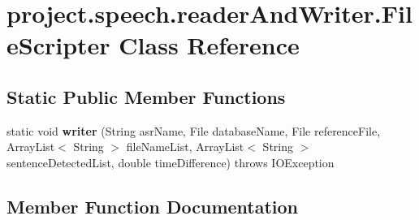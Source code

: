 \section{project.\+speech.\+reader\+And\+Writer.\+File\+Scripter Class Reference}
\label{classproject_1_1speech_1_1reader_and_writer_1_1_file_scripter}
\subsection*{Static Public Member Functions}
\begin{DoxyCompactItemize}
\item 
static void {\bf writer} (String asr\+Name, File database\+Name, File reference\+File, Array\+List$<$ String $>$ file\+Name\+List, Array\+List$<$ String $>$ sentence\+Detected\+List, double time\+Difference)  throws I\+O\+Exception 
\end{DoxyCompactItemize}


\subsection{Member Function Documentation}
